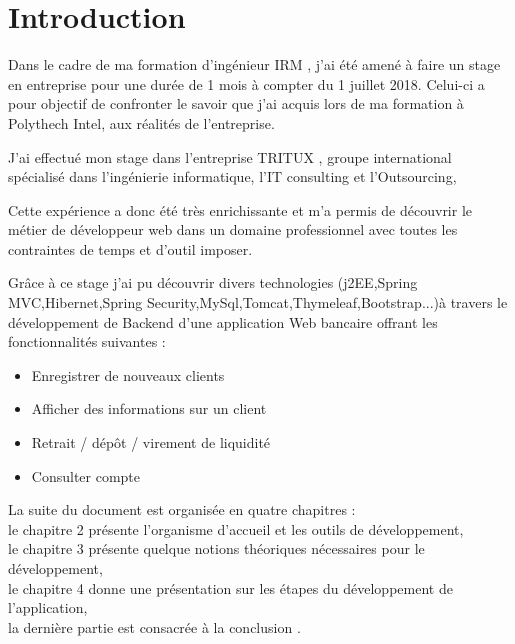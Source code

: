 \documentclass[../rapportdestage.tex]{subfiles}
\begin{document}
\section{Introduction}

Dans le cadre de ma formation d’ingénieur IRM , j’ai été amené à faire un stage en entreprise pour une durée de 1 mois à compter du 1 juillet 2018. Celui-ci a pour objectif de confronter le savoir que j’ai acquis lors de ma formation à  Polythech Intel, aux réalités de l’entreprise.

J’ai effectué mon stage dans l’entreprise TRITUX , groupe international spécialisé dans l’ingénierie informatique, l’IT consulting et l’Outsourcing,

Cette expérience a donc été très enrichissante et m'a permis
de découvrir le métier de développeur web dans un domaine professionnel avec toutes les contraintes de temps et d’outil imposer.

Grâce à ce stage j’ai pu  découvrir divers technologies (j2EE,Spring MVC,Hibernet,Spring Security,MySql,Tomcat,Thymeleaf,Bootstrap...)à travers le développement de Backend d’une application Web bancaire offrant les fonctionnalités
suivantes :
\begin{itemize}
\item Enregistrer de nouveaux clients
\item Afficher des informations  sur un client
\item Retrait / dépôt / virement de liquidité
\item Consulter compte 
\end{itemize}
\vspace*{1cm}

La suite du document est organisée en quatre chapitres :\\
le chapitre 2 présente l'organisme d'accueil et les outils de développement,\\
le chapitre 3 présente quelque notions théoriques nécessaires pour le développement,\\
le chapitre 4 donne une présentation sur les étapes du développement de l'application,\\
la dernière partie est consacrée à la conclusion .
\end{document}
